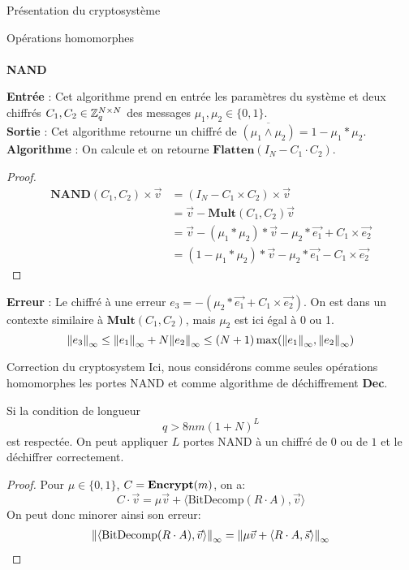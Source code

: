 \begin{section}{Présentation du cryptosystème}
\begin{subsection}{Opérations homomorphes}
	\paragraph{}
	\textbf{NAND}
	\flushleft
	
	\textbf{Entrée} : Cet algorithme prend en entrée les paramètres du système et deux chiffrés $C_1, C_2 \in \mathbb{Z}_q^{N \times N}$ des messages $\mu_1, \mu_2 \in \{ 0,1\}$.\\
	\textbf{Sortie} : Cet algorithme retourne un chiffré de $\overline{(\mu_1 \land \mu_2)} = 1 - \mu_1 * \mu_2$. \\
	\textbf{Algorithme} : On calcule et on retourne $\textbf{Flatten}(I_N - C_1 \cdot C_2)$.
	\begin{proof}
	\begin{align*}
	\textbf{NAND}(C_1, C_2) \times \vec{v} &= (I_N - C_1 \times C_2) \times \vec{v} \\
	&= \vec{v} - \textbf{Mult}(C_1, C_2)\vec{v} \\
	&= \vec{v} - (\mu_1 * \mu_2) * \vec{v} - \mu_2 * \vec{e_1} + C_1 \times \vec{e_2} \\
	&= (1 - \mu_1 * \mu_2) * \vec{v} - \mu_2 * \vec{e_1} - C_1 \times \vec{e_2}
	\end{align*}
	\end{proof}
	\textbf{Erreur} : Le chiffré à une erreur 
	$e_3 = -(\mu_2 * \vec{e_1} + C_1 \times \vec{e_2})$. On est dans 
	un contexte similaire à $\textbf{Mult}(C_1, C_2)$, mais 
	$\mu_2$ est ici égal à 0 ou 1.
\[{\|e_3\|}_{\infty} \leq {\|e_1\|}_{\infty} + N {\|e_2\|}_{\infty} \leq (N+1) \max({\|e_1\|}_{\infty}, {\|e_2\|}_{\infty})\]
	\end{subsection}
	\begin{subsection}{Correction du cryptosystem}
	Ici, nous considérons comme seules opérations homomorphes les portes
	NAND et comme algorithme de déchiffrement \textbf{Dec}.
	\begin{prop}
	Si la condition de longueur 
	\[q > 8nm (1 + N)^L \]
	est respectée. On peut appliquer $L$ portes NAND à un chiffré
	de $0$ ou de $1$ et le déchiffrer correctement.
	\end{prop}
	\begin{proof}
	Pour $\mu \in \{0,1\}$, $C = \text{\textbf{Encrypt}}(m)$, on a:
	\[
	C\cdot \vec{v} = \mu \vec{v} + \langle \text{BitDecomp}(R\cdot A), \vec{v} \rangle 
	\]
	On peut donc minorer ainsi son erreur:
	\begin{align*}
	\norm{\langle \text{BitDecomp}(R\cdot A), \vec{v} \rangle}
	&= \norm{\mu \vec{v} + \langle R\cdot A, \vec{s} \rangle}\\

\end{align*}
\end{proof}
\end{subsection}
\end{section}
